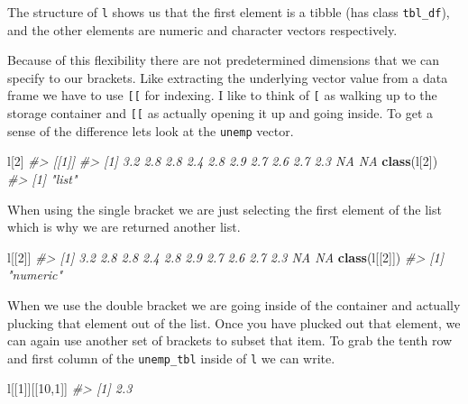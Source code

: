 \documentclass[
]{book}
\newenvironment{Shaded}{\begin{snugshade}}{\end{snugshade}}
\newcommand{\CommentTok}[1]{\textcolor[rgb]{0.56,0.35,0.01}{\textit{#1}}}
\newcommand{\DecValTok}[1]{\textcolor[rgb]{0.00,0.00,0.81}{#1}}
\newcommand{\KeywordTok}[1]{\textcolor[rgb]{0.13,0.29,0.53}{\textbf{#1}}}
\newcommand{\NormalTok}[1]{#1}
\begin{document}
The structure of \texttt{l} shows us that the first element is a tibble (has class \texttt{tbl\_df}), and the other elements are numeric and character vectors respectively.

Because of this flexibility there are not predetermined dimensions that we can specify to our brackets. Like extracting the underlying vector value from a data frame we have to use \texttt{{[}{[}} for indexing. I like to think of \texttt{{[}} as walking up to the storage container and \texttt{{[}{[}} as actually opening it up and going inside. To get a sense of the difference lets look at the \texttt{unemp} vector.

\begin{Shaded}
\begin{Highlighting}[]
\NormalTok{l[}\DecValTok{2}\NormalTok{]}
\CommentTok{\#\textgreater{} [[1]]}
\CommentTok{\#\textgreater{}  [1] 3.2 2.8 2.8 2.4 2.8 2.9 2.7 2.6 2.7 2.3  NA  NA}
\KeywordTok{class}\NormalTok{(l[}\DecValTok{2}\NormalTok{])}
\CommentTok{\#\textgreater{} [1] "list"}
\end{Highlighting}
\end{Shaded}

When using the single bracket we are just selecting the first element of the list which is why we are returned another list.

\begin{Shaded}
\begin{Highlighting}[]
\NormalTok{l[[}\DecValTok{2}\NormalTok{]]}
\CommentTok{\#\textgreater{}  [1] 3.2 2.8 2.8 2.4 2.8 2.9 2.7 2.6 2.7 2.3  NA  NA}
\KeywordTok{class}\NormalTok{(l[[}\DecValTok{2}\NormalTok{]])}
\CommentTok{\#\textgreater{} [1] "numeric"}
\end{Highlighting}
\end{Shaded}

When we use the double bracket we are going inside of the container and actually plucking that element out of the list. Once you have plucked out that element, we can again use another set of brackets to subset that item. To grab the tenth row and first column of the \texttt{unemp\_tbl} inside of \texttt{l} we can write.

\begin{Shaded}
\begin{Highlighting}[]
\NormalTok{l[[}\DecValTok{1}\NormalTok{]][[}\DecValTok{10}\NormalTok{,}\DecValTok{1}\NormalTok{]]}
\CommentTok{\#\textgreater{} [1] 2.3}
\end{Highlighting}
\end{Shaded}
\end{document}
